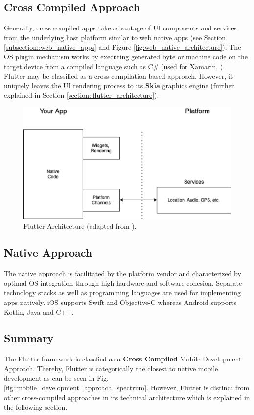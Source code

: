 \subsection{Cross Compiled Approach} \label{subsection::cross_compiled_approach}
Generally, cross compiled apps take advantage of UI components and services from the underlying host platform similar to web native apps (see Section \ref{subsection::web_native_apps} and Figure \ref{fig:web_native_architecture}).
The OS plugin mechanism works by executing generated byte or machine code on the target device from a compiled language such as C\# (used for Xamarin, \cite{Xamarin2021}).\\
Flutter may be classified as a cross compilation based approach. However, it uniquely leaves the UI rendering process to its \textbf{Skia} graphics engine (further explained in Section \ref{section::flutter_architecture}).

\begin{figure}
    \centering
    \includegraphics[width=.8\linewidth]{images/architectures/flutter_architecture.eps}
    \caption{Flutter Architecture (adapted from \cite{Cunha2018}).}
    \label{fig:flutter_architecture}
\end{figure}

\subsection{Native Approach}
The native approach is facilitated by the platform vendor and characterized by optimal OS integration through high hardware and software cohesion.
Separate technology stacks as well as programming languages are used for implementing apps natively. 
iOS supports Swift and Objective-C whereas Android supports Kotlin, Java and C++.

\subsection{Summary}
The Flutter framework is classfied as a \textbf{Cross-Compiled} Mobile Development Approach. Thereby, Flutter is categorically the closest to 
native mobile development as can be seen in Fig. \ref{fig::mobile_development_approach_spectrum}.
However, Flutter is distinct from other cross-compiled approaches in its technical architecture which is explained in the following section.


